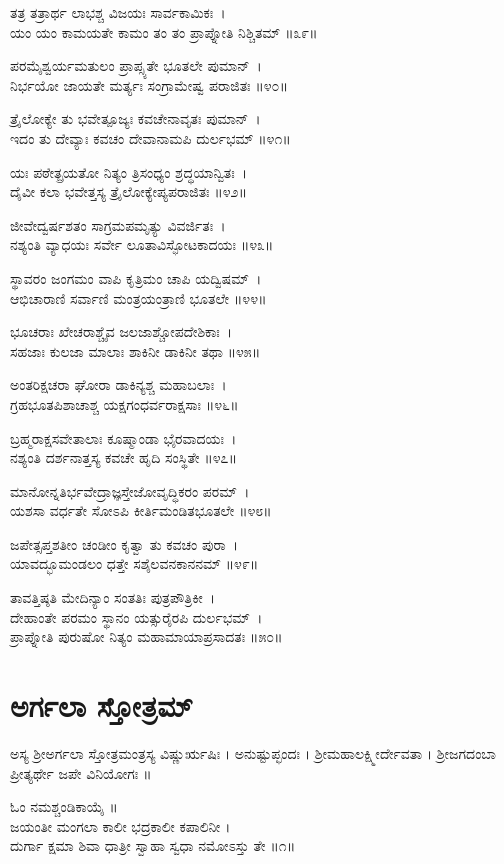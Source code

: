 ತತ್ರ ತತ್ರಾರ್ಥ ಲಾಭಶ್ಚ ವಿಜಯಃ ಸಾರ್ವಕಾಮಿಕಃ~।\\
ಯಂ ಯಂ ಕಾಮಯತೇ ಕಾಮಂ ತಂ ತಂ ಪ್ರಾಪ್ನೋತಿ ನಿಶ್ಚಿತಮ್ ॥೩೯॥

ಪರಮೈಶ್ವರ್ಯಮತುಲಂ ಪ್ರಾಪ್ಸ್ಯತೇ ಭೂತಲೇ ಪುಮಾನ್~।\\
ನಿರ್ಭಯೋ ಜಾಯತೇ ಮರ್ತ್ಯಃ ಸಂಗ್ರಾಮೇಷ್ವ ಪರಾಜಿತಃ ॥೪೦॥

ತ್ರೈಲೋಕ್ಯೇ ತು ಭವೇತ್ಪೂಜ್ಯಃ ಕವಚೇನಾವೃತಃ ಪುಮಾನ್~।\\
ಇದಂ ತು ದೇವ್ಯಾಃ ಕವಚಂ ದೇವಾನಾಮಪಿ ದುರ್ಲಭಮ್ ॥೪೧॥

ಯಃ ಪಠೇತ್ಪ್ರಯತೋ ನಿತ್ಯಂ ತ್ರಿಸಂಧ್ಯಂ ಶ್ರದ್ಧಯಾನ್ವಿತಃ~।\\
ದೈವೀ ಕಲಾ ಭವೇತ್ತಸ್ಯ ತ್ರೈಲೋಕ್ಯೇಪ್ಯಪರಾಜಿತಃ ॥೪೨॥

ಜೀವೇದ್ವರ್ಷಶತಂ ಸಾಗ್ರಮಪಮೃತ್ಯು ವಿವರ್ಜಿತಃ~।\\
ನಶ್ಯಂತಿ ವ್ಯಾಧಯಃ ಸರ್ವೇ ಲೂತಾವಿಸ್ಫೋಟಕಾದಯಃ ॥೪೩॥

ಸ್ಥಾವರಂ ಜಂಗಮಂ ವಾಪಿ ಕೃತ್ರಿಮಂ ಚಾಪಿ ಯದ್ವಿಷಮ್~।\\
ಆಭಿಚಾರಾಣಿ ಸರ್ವಾಣಿ ಮಂತ್ರಯಂತ್ರಾಣಿ ಭೂತಲೇ ॥೪೪॥

ಭೂಚರಾಃ ಖೇಚರಾಶ್ಚೈವ ಜಲಜಾಶ್ಚೋಪದೇಶಿಕಾಃ~।\\
ಸಹಜಾಃ ಕುಲಜಾ ಮಾಲಾಃ ಶಾಕಿನೀ ಡಾಕಿನೀ ತಥಾ ॥೪೫॥

ಅಂತರಿಕ್ಷಚರಾ ಘೋರಾ ಡಾಕಿನ್ಯಶ್ಚ ಮಹಾಬಲಾಃ~।\\
ಗ್ರಹಭೂತಪಿಶಾಚಾಶ್ಚ ಯಕ್ಷಗಂಧರ್ವರಾಕ್ಷಸಾಃ ॥೪೬॥

ಬ್ರಹ್ಮರಾಕ್ಷಸವೇತಾಲಾಃ ಕೂಷ್ಮಾಂಡಾ ಭೈರವಾದಯಃ~।\\
ನಶ್ಯಂತಿ ದರ್ಶನಾತ್ತಸ್ಯ ಕವಚೇ ಹೃದಿ ಸಂಸ್ಥಿತೇ ॥೪೭॥

ಮಾನೋನ್ನತಿರ್ಭವೇದ್ರಾಜ್ಞಸ್ತೇಜೋವೃದ್ಧಿಕರಂ ಪರಮ್~।\\
ಯಶಸಾ ವರ್ಧತೇ ಸೋಽಪಿ ಕೀರ್ತಿಮಂಡಿತಭೂತಲೇ ॥೪೮॥

ಜಪೇತ್ಸಪ್ತಶತೀಂ ಚಂಡೀಂ ಕೃತ್ವಾ ತು ಕವಚಂ ಪುರಾ~।\\
ಯಾವದ್ಭೂಮಂಡಲಂ ಧತ್ತೇ ಸಶೈಲವನಕಾನನಮ್ ॥೪೯॥

ತಾವತ್ತಿಷ್ಠತಿ ಮೇದಿನ್ಯಾಂ ಸಂತತಿಃ ಪುತ್ರಪೌತ್ರಿಕೀ~।\\
ದೇಹಾಂತೇ ಪರಮಂ ಸ್ಥಾನಂ ಯತ್ಸುರೈರಪಿ ದುರ್ಲಭಮ್~।\\
ಪ್ರಾಪ್ನೋತಿ ಪುರುಷೋ ನಿತ್ಯಂ ಮಹಾಮಾಯಾಪ್ರಸಾದತಃ ॥೫೦॥
\section{ಅರ್ಗಲಾ ಸ್ತೋತ್ರಮ್}
ಅಸ್ಯ ಶ್ರೀಅರ್ಗಲಾ ಸ್ತೋತ್ರಮಂತ್ರಸ್ಯ ವಿಷ್ಣುರ್ಋಷಿಃ । ಅನುಷ್ಟುಪ್ಛಂದಃ ।  ಶ್ರೀಮಹಾಲಕ್ಷ್ಮೀರ್ದೇವತಾ ।  ಶ್ರೀಜಗದಂಬಾ ಪ್ರೀತ್ಯರ್ಥೇ ಜಪೇ ವಿನಿಯೋಗಃ ॥

ಓಂ ನಮಶ್ಚಂಡಿಕಾಯೈ ॥\\
ಜಯಂತೀ ಮಂಗಲಾ ಕಾಲೀ ಭದ್ರಕಾಲೀ ಕಪಾಲಿನೀ ।\\
ದುರ್ಗಾ ಕ್ಷಮಾ ಶಿವಾ ಧಾತ್ರೀ ಸ್ವಾಹಾ ಸ್ವಧಾ ನಮೋಽಸ್ತು ತೇ ॥೧॥

